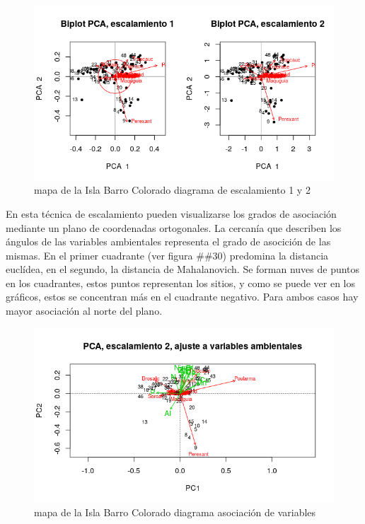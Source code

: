 \documentclass[11pt,]{article}
\begin{document}
\begin{figure}
\centering
\includegraphics[width=1.00000\textwidth]{escalamiento_1_2.png}
\caption{mapa de la Isla Barro Colorado diagrama de escalamiento 1 y 2
\label{fig:bci_map}}
\end{figure}

En esta técnica de escalamiento pueden visualizarse los grados de
asociación mediante un plano de coordenadas ortogonales. La cercanía que
describen los ángulos de las variables ambientales representa el grado
de asocición de las mismas. En el primer cuadrante (ver figura \#\#30)
predomina la distancia euclídea, en el segundo, la distancia de
Mahalanovich. Se forman nuves de puntos en los cuadrantes, estos puntos
representan los sitios, y como se puede ver en los gráficos, estos se
concentran más en el cuadrante negativo. Para ambos casos hay mayor
asociación al norte del plano.

\begin{figure}
\centering
\includegraphics[width=1.00000\textwidth]{escalamiento_ajuste_2.png}
\caption{mapa de la Isla Barro Colorado diagrama asociación de
variables\label{fig:bci_map}}
\end{figure}
\end{document}
